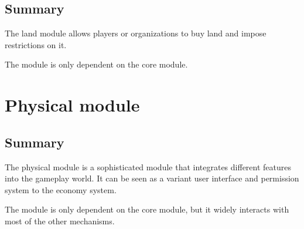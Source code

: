 \documentclass{report}
\begin{document}
		\chapter{Summary}

			The land module allows players or organizations to buy land and impose restrictions on it.

			The module is only dependent on the core module.

	\part{Physical module}
		\label{sec:physical-module}
		\chapter{Summary}
			The physical module is a sophisticated module that integrates different features into the gameplay world.
			It can be seen as a variant user interface and permission system to the economy system.

			The module is only dependent on the core module, but it widely interacts with most of the other mechanisms.
\end{document}
